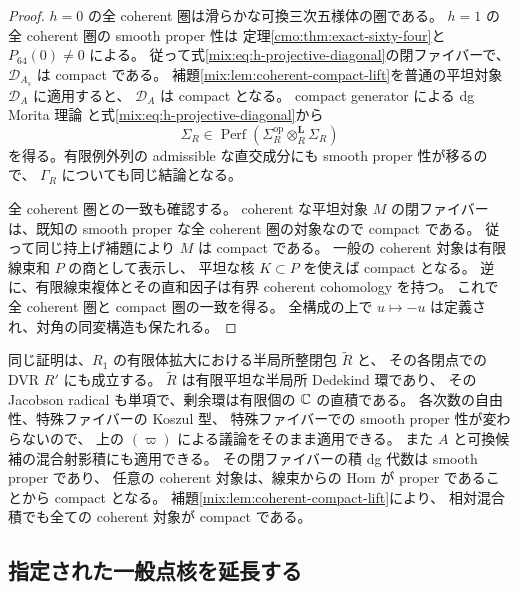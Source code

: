 \begin{proof}
$h=0$ の全 coherent 圏は滑らかな可換三次五様体の圏である。
$h=1$ の全 coherent 圏の smooth proper 性は
定理\ref{cmo:thm:exact-sixty-four}と $P_{64}(0)\ne0$ による。
従って式\eqref{mix:eq:h-projective-diagonal}の閉ファイバーで、
$\mathcal D_{A_s}$ は compact である。
補題\ref{mix:lem:coherent-compact-lift}を普通の平坦対象 $\mathcal D_A$ に適用すると、
$\mathcal D_A$ は compact となる。
compact generator による dg Morita 理論
\cite[Theorem~3.8(c)]{NFMKellerDg}と式\eqref{mix:eq:h-projective-diagonal}から
\[
 \Sigma_R\in\operatorname{Perf}
       (\Sigma_R^{\mathrm{op}}\otimes_R^{\mathbf L}\Sigma_R)
\]
を得る。有限例外列の admissible な直交成分にも smooth proper 性が移るので、
$\Gamma_R$ についても同じ結論となる。

全 coherent 圏との一致も確認する。
coherent な平坦対象 $M$ の閉ファイバーは、既知の smooth proper な全 coherent 圏の対象なので compact である。
従って同じ持上げ補題により $M$ は compact である。
一般の coherent 対象は有限線束和 $P$ の商として表示し、
平坦な核 $K\subset P$ を使えば compact となる。
逆に、有限線束複体とその直和因子は有界 coherent cohomology を持つ。
これで全 coherent 圏と compact 圏の一致を得る。
全構成の上で $u\mapsto-u$ は定義され、対角の同変構造も保たれる。
\end{proof}

同じ証明は、$R_1$ の有限体拡大における半局所整閉包 $\widetilde R$ と、
その各閉点での DVR $R'$ にも成立する。
$\widetilde R$ は有限平坦な半局所 Dedekind 環であり、
その Jacobson radical も単項で、剰余環は有限個の $\mathbb C$ の直積である。
各次数の自由性、特殊ファイバーの Koszul 型、
特殊ファイバーでの smooth proper 性が変わらないので、
上の $(\varpi)$ による議論をそのまま適用できる。
また $A$ と可換候補の混合射影積にも適用できる。
その閉ファイバーの積 dg 代数は smooth proper であり、
任意の coherent 対象は、線束からの Hom が proper であることから compact となる。
補題\ref{mix:lem:coherent-compact-lift}により、
相対混合積でも全ての coherent 対象が compact である。

\subsection{指定された一般点核を延長する}

